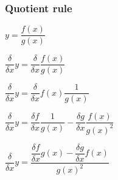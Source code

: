 \subsubsection{Quotient rule}

\(y=\dfrac{f(x)}{g(x)}\)

\(\dfrac{\delta }{\delta x}y=\dfrac{\delta }{\delta x}\dfrac{f(x)}{g(x)}\)

\(\dfrac{\delta }{\delta x}y=\dfrac{\delta }{\delta x}f(x)\dfrac{1}{g(x)}\)

\(\dfrac{\delta }{\delta x}y=\dfrac{\delta f}{\delta x}\dfrac{1}{g(x)}-\dfrac{\delta g}{\delta x}\dfrac{f(x)}{g(x)^2}\)

\(\dfrac{\delta }{\delta x}y=\dfrac{\dfrac{\delta f}{\delta x}g(x)-\dfrac{\delta g}{\delta x}f(x)}{g(x)^2}\)

